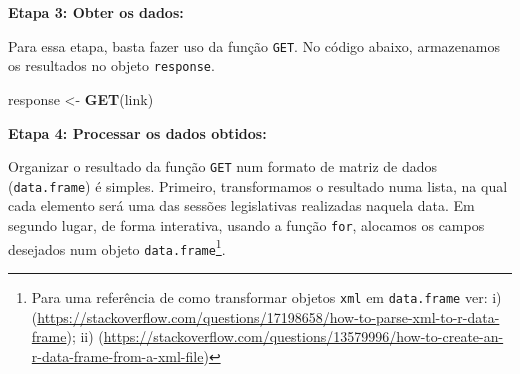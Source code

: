 \documentclass[]{book}
\newenvironment{Shaded}{\begin{snugshade}}{\end{snugshade}}
\newcommand{\KeywordTok}[1]{\textcolor[rgb]{0.13,0.29,0.53}{\textbf{#1}}}
\newcommand{\NormalTok}[1]{#1}
\newcommand{\StringTok}[1]{\textcolor[rgb]{0.31,0.60,0.02}{#1}}
\begin{document}
\textbf{Etapa 3: Obter os dados:}

Para essa etapa, basta fazer uso da função \texttt{GET}. No código abaixo, armazenamos os resultados no objeto \texttt{response}.

\begin{Shaded}
\begin{Highlighting}[]
\NormalTok{response <-}\StringTok{ }\KeywordTok{GET}\NormalTok{(link)}
\end{Highlighting}
\end{Shaded}

\textbf{Etapa 4: Processar os dados obtidos:}

Organizar o resultado da função \texttt{GET} num formato de matriz de dados (\texttt{data.frame}) é
simples. Primeiro, transformamos o resultado numa lista, na qual cada elemento será
uma das sessões legislativas realizadas naquela data. Em segundo lugar, de forma
interativa, usando a função \texttt{for}, alocamos os campos desejados num objeto \texttt{data.frame}\footnote{Para uma referência de como transformar objetos \texttt{xml} em \texttt{data.frame} ver: i) (\url{https://stackoverflow.com/questions/17198658/how-to-parse-xml-to-r-data-frame}); ii) (\url{https://stackoverflow.com/questions/13579996/how-to-create-an-r-data-frame-from-a-xml-file})}.
\end{document}
